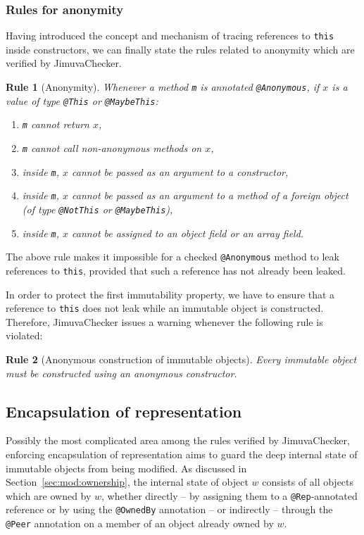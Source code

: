 \documentclass{pracamgr}
\theoremstyle{break}
\theoremstyle{break}
\theoremstyle{break}
\newtheorem{verrule}{Rule}
\begin{document}
\subsubsection{Rules for anonymity} 

Having introduced the concept and mechanism of tracing references to
\texttt{this} inside constructors, we can finally state the rules
related to anonymity which are verified by JimuvaChecker.

\begin{verrule}[Anonymity] \label{vrl:anon}
  Whenever a method \texttt{m} is annotated \texttt{@Anonymous}, if
  $x$ is a value of type \texttt{@This} or \texttt{@MaybeThis}:
  \begin{enumerate}[label=(\arabic*)]
  \item \label{pnt:anon-ret} \texttt{m} cannot return $x$, 
  \item \texttt{m} cannot call non-anonymous methods on $x$, 
  \item inside \texttt{m}, $x$ cannot be passed as an argument to a constructor, 
  \item inside \texttt{m}, $x$ cannot be passed as an argument to a
    method of a foreign object (of type \texttt{@NotThis} or
    \texttt{@MaybeThis}),
  \item inside \texttt{m}, $x$ cannot be assigned to an object field
    or an array field.
  \end{enumerate}
\end{verrule}

The above rule makes it impossible for a checked \texttt{@Anonymous}
method to leak references to \texttt{this}, provided that such a
reference has not already been leaked.

In order to protect the first immutability property, we have to ensure
that a reference to \texttt{this} does not leak while an immutable
object is constructed. Therefore, JimuvaChecker issues a warning
whenever the following rule is violated:
\begin{verrule}[Anonymous construction of immutable objects]
  Every immutable object must be constructed using an anonymous
  constructor.
\end{verrule}


\subsection{Encapsulation of representation}
\label{sec:chk:rep}

Possibly the most complicated area among the rules verified by
JimuvaChecker, enforcing encapsulation of representation aims to guard
the deep internal state of immutable objects from being modified. As
discussed in Section~\ref{sec:mod:ownership}, the internal state of
object $w$ consists of all objects which are owned by $w$, whether
directly -- by assigning them to a \texttt{@Rep}-annotated reference
or by using the \texttt{@OwnedBy} annotation -- or indirectly --
through the \texttt{@Peer} annotation on a member of an object already
owned by $w$.
\end{document}
